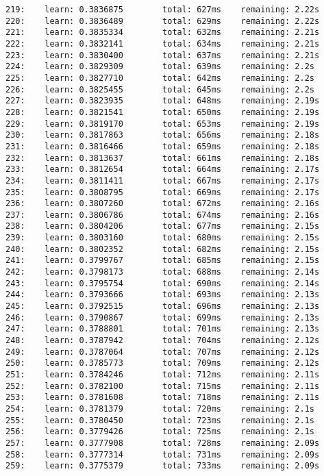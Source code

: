 \documentclass[11pt]{article}
\begin{document}
\begin{Verbatim}[commandchars=\\\{\}]
219:    learn: 0.3836875        total: 627ms    remaining: 2.22s
220:    learn: 0.3836489        total: 629ms    remaining: 2.22s
221:    learn: 0.3835334        total: 632ms    remaining: 2.21s
222:    learn: 0.3832141        total: 634ms    remaining: 2.21s
223:    learn: 0.3830400        total: 637ms    remaining: 2.21s
224:    learn: 0.3829309        total: 639ms    remaining: 2.2s
225:    learn: 0.3827710        total: 642ms    remaining: 2.2s
226:    learn: 0.3825455        total: 645ms    remaining: 2.2s
227:    learn: 0.3823935        total: 648ms    remaining: 2.19s
228:    learn: 0.3821541        total: 650ms    remaining: 2.19s
229:    learn: 0.3819170        total: 653ms    remaining: 2.19s
230:    learn: 0.3817863        total: 656ms    remaining: 2.18s
231:    learn: 0.3816466        total: 659ms    remaining: 2.18s
232:    learn: 0.3813637        total: 661ms    remaining: 2.18s
233:    learn: 0.3812654        total: 664ms    remaining: 2.17s
234:    learn: 0.3811411        total: 667ms    remaining: 2.17s
235:    learn: 0.3808795        total: 669ms    remaining: 2.17s
236:    learn: 0.3807260        total: 672ms    remaining: 2.16s
237:    learn: 0.3806786        total: 674ms    remaining: 2.16s
238:    learn: 0.3804206        total: 677ms    remaining: 2.15s
239:    learn: 0.3803160        total: 680ms    remaining: 2.15s
240:    learn: 0.3802352        total: 682ms    remaining: 2.15s
241:    learn: 0.3799767        total: 685ms    remaining: 2.15s
242:    learn: 0.3798173        total: 688ms    remaining: 2.14s
243:    learn: 0.3795754        total: 690ms    remaining: 2.14s
244:    learn: 0.3793666        total: 693ms    remaining: 2.13s
245:    learn: 0.3792515        total: 696ms    remaining: 2.13s
246:    learn: 0.3790867        total: 699ms    remaining: 2.13s
247:    learn: 0.3788801        total: 701ms    remaining: 2.13s
248:    learn: 0.3787942        total: 704ms    remaining: 2.12s
249:    learn: 0.3787064        total: 707ms    remaining: 2.12s
250:    learn: 0.3785773        total: 709ms    remaining: 2.12s
251:    learn: 0.3784246        total: 712ms    remaining: 2.11s
252:    learn: 0.3782100        total: 715ms    remaining: 2.11s
253:    learn: 0.3781608        total: 718ms    remaining: 2.11s
254:    learn: 0.3781379        total: 720ms    remaining: 2.1s
255:    learn: 0.3780450        total: 723ms    remaining: 2.1s
256:    learn: 0.3779426        total: 725ms    remaining: 2.1s
257:    learn: 0.3777908        total: 728ms    remaining: 2.09s
258:    learn: 0.3777314        total: 731ms    remaining: 2.09s
259:    learn: 0.3775379        total: 733ms    remaining: 2.09s

\end{Verbatim}
\end{document}
